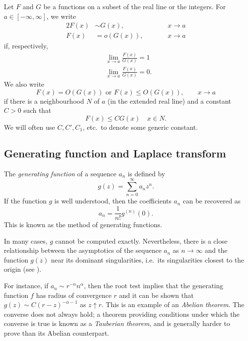 
Let $F$ and $G$ be a functions on a subset of the real line or the integers.
For $a\in[-\infty,\infty]$, we write
\begin{alignat}{2}
F(x) &\sim G(x), &&\qquad x \to a \\
F(x) &= o(G(x)), &&\qquad x \to a
\end{alignat}
if, respectively,
\begin{align}
&\lim_{x\to a} \frac{F(x)}{G(x)} = 1 \\
&\lim_{x\to a} \frac{F(x)}{G(x)} = 0.
\end{align}
We also write
\begin{equation}
F(x) = O(G(x))
	\text{ or }
F(x) \le O(G(x)),
	\qquad
x \to a
\end{equation}
if there is a neighbourhood $N$ of $a$ (in the extended real line)
and a constant $C > 0$ such that
\begin{equation}
F(x) \le C G(x) \quad x \in N.
\end{equation}
We will often use $C, C', C_1$, etc.\ to denote some generic constant.


\subsection{Generating function and Laplace transform}

The \emph{generating function} of a sequence $a_n$ is defined by
\begin{equation}
g(z) = \sum_{n=0}^\infty a_n z^n.
\end{equation}
If the function $g$ is well understood, then the coefficients $a_n$ can be
recovered as
\begin{equation}
a_n = \frac{1}{n!} g^{(n)}(0).
\end{equation}
This is known as the method of generating functions.

In many cases, $g$ cannot be computed exactly. Nevertheless, there is a close
relationship between the asymptotics of the sequence $a_n$
as $n\to\infty$ and the function $g(z)$ near its dominant singularities, i.e.\
its singularities closest to the origin (see \cite{FS09}).

For instance, if $a_n \sim r^{-n} n^\alpha$, then the root test implies that
the generating function $f$ has radius of convergence $r$ and it can be shown
that $g(z) \sim C (r - z)^{-\alpha-1}$ as $z \uparrow r$.		%
This is an
example of an \emph{Abelian theorem}. The converse does not always hold; a
theorem providing conditions under which the converse is true is known as a
\emph{Tauberian theorem}, and is generally harder to prove than its Abelian
counterpart.

